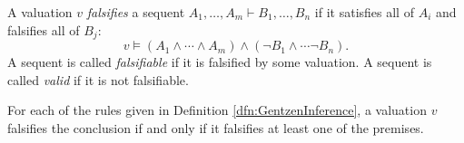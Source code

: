 \begin{page}
\setcounter{section}{2}
\setcounter{subsection}{4}
\setcounter{dfn}{8}
\label{portion:505}

\begin{dfn}
\label{dfn:FalsifySequent}
A valuation $v$ \emph{falsifies} a sequent $A_1, \ldots, A_m \vdash B_1, \ldots, B_n$ if it satisfies all of $A_i$ and falsifies all of $B_j$:
\[
v \vDash (A_1 \wedge \cdots \wedge A_m) \wedge (\neg B_1 \wedge \cdots \neg B_n).
\]
A sequent is called \emph{falsifiable} if it is falsified by some valuation.
A sequent is called \emph{valid} if it is not falsifiable.
\end{dfn}

\end{page}

\begin{page}
\setcounter{section}{2}
\setcounter{subsection}{4}
\setcounter{dfn}{9}
\label{portion:508}

\begin{lem}
\label{lem:RuleTrees}
For each of the rules given in Definition \ref{dfn:GentzenInference},
a valuation $v$ falsifies the conclusion if and only if it falsifies at least one of the premises.
\end{lem}

\end{page}

